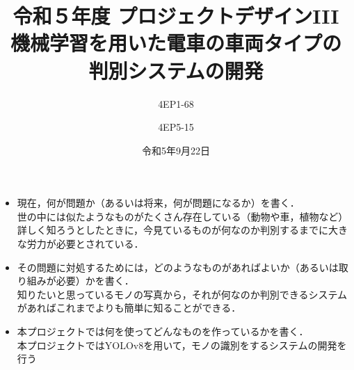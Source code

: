 % 
%

\title{
{\normalsize 令和５年度 プロジェクトデザインIII}\\\vspace{10mm}
{\LARGE 機械学習を用いた電車の車両タイプの\\判別システムの開発}
}
\date{令和5年9月22日}
\author{
4EP1-68\\  \and
4EP5-15\\  
}



\usepackage{subcaption}




\maketitle %
\addtocounter{page}{1}
\thispagestyle{myfirstpage}

\begin{itemize}
 \item 現在，何が問題か（あるいは将来，何が問題になるか）を書く．\\
 世の中には似たようなものがたくさん存在している（動物や車，植物など）
 詳しく知ろうとしたときに，今見ているものが何なのか判別するまでに大きな労力が必要とされている．
 \item その問題に対処するためには，どのようなものがあればよいか（あるいは取り組みが必要）かを書く．\\
 知りたいと思っているモノの写真から，それが何なのか判別できるシステムがあればこれまでよりも簡単に知ることができる．
 \item 本プロジェクトでは何を使ってどんなものを作っているかを書く．\\
 本プロジェクトではYOLOv8を用いて，モノの識別をするシステムの開発を行う
\end{itemize}
\newpage

